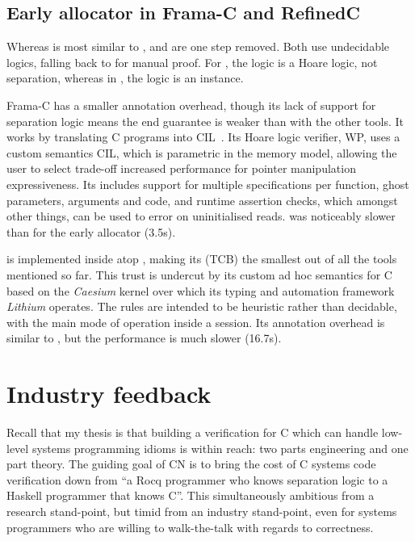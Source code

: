 \subsection{Early allocator in Frama-C and RefinedC}

Whereas  is most similar to ,  and
 are one step removed. Both use undecidable logics, falling back
to  for manual proof. For , the logic is a Hoare logic,
not separation, whereas in , the logic is an  instance.

Frama-C has a smaller annotation overhead, though its lack of support for
separation logic means the end guarantee is weaker than with the other tools.
It works by translating C programs into CIL~. Its Hoare
logic verifier, WP, uses a custom semantics CIL, which is parametric in the
memory model, allowing the user to select trade-off increased performance for
pointer manipulation expressiveness. Its includes support for multiple
specifications per function, ghost parameters, arguments and code, and runtime
assertion checks, which amongst other things, can be used to error on
uninitialised reads.  was noticeably slower than  for the
early allocator (3.5s).

 is implemented inside  atop , making its
 (TCB) the smallest out of all the tools
mentioned so far. This trust is undercut by its custom ad hoc semantics for C
based on the \emph{Caesium} kernel over which its typing and automation
framework \emph{Lithium} operates. The rules are intended to be heuristic
rather than decidable, with the main mode of operation inside a 
session. Its annotation overhead is similar to , but the performance is
much slower (16.7s).

\section{Industry feedback}

Recall that my thesis is that building a verification for C which can handle
low-level systems programming idioms is within reach: two parts engineering and
one part theory. The guiding goal of CN is to bring the cost of C systems code
verification down from ``a Rocq programmer who knows separation logic to a
Haskell programmer that knows C''. This simultaneously ambitious from a
research stand-point, but timid from an industry stand-point, even for systems
programmers who are willing to walk-the-talk with regards to correctness.


